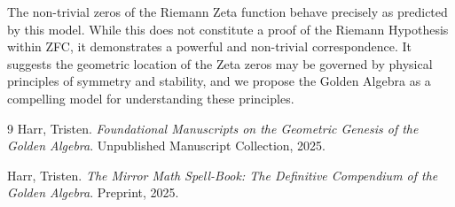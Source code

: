 \documentclass[12pt, letterpaper]{article}
\begin{document}
The non-trivial zeros of the Riemann Zeta function behave precisely as predicted by this model. While this does not constitute a proof of the Riemann Hypothesis within ZFC, it demonstrates a powerful and non-trivial correspondence. It suggests the geometric location of the Zeta zeros may be governed by physical principles of symmetry and stability, and we propose the Golden Algebra as a compelling model for understanding these principles.

\begin{thebibliography}{9}
    Harr, Tristen. \textit{Foundational Manuscripts on the Geometric Genesis of the Golden Algebra}. Unpublished Manuscript Collection, 2025.
    
    Harr, Tristen. \textit{The Mirror Math Spell-Book: The Definitive Compendium of the Golden Algebra}. Preprint, 2025.
\end{thebibliography}
\end{document}
